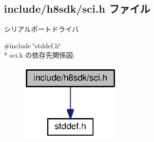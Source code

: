 \subsection{include/h8sdk/sci.h ファイル}
\label{sci_8h}


シリアルポートドライバ  


{\ttfamily \#include \char`\"{}stddef.\+h\char`\"{}}\\*
sci.\+h の依存先関係図\+:
\nopagebreak
\begin{figure}[H]
\begin{center}
\leavevmode
\includegraphics[width=145pt]{de/dc7/sci_8h__incl}
\end{center}
\end{figure}
